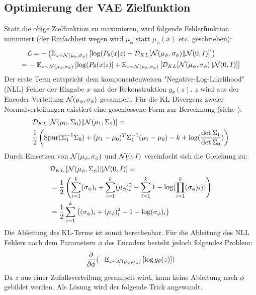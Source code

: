 \subsection{Optimierung der VAE Zielfunktion}\label{sec:vae_loss_func}
Statt die obige Zielfunktion zu maximieren, wird folgende Fehlerfunktion minimiert (der Einfachheit wegen wird $\mu_\phi$ statt $\mu_\phi(x)$ etc. geschrieben):
\begin{align}\label{eq:gradient}
  &\mathcal{L} = - \left( \mathbb{E}_{z \sim \mathcal{N}(\mu_\phi, \sigma_\phi)}\left[ \log(P_\theta(x \vert z) - \mathcal{D}_{KL}[\mathcal{N}(\mu_\phi, \sigma_\phi) \| \mathcal{N}(0, I)] \right] \right) \\
=& \, -\mathbb{E}_{z \sim \mathcal{N}(\mu_\phi, \sigma_\phi)}\left[ \log(P_\theta(x \vert z) \right] + \mathbb{E}_{z \sim \mathcal{N}(\mu_\phi, \sigma_\phi)}\left[ \mathcal{D}_{KL}[\mathcal{N}(\mu_\phi, \sigma_\phi) \| \mathcal{N}(0, I)] \right]
\end{align}
Der erste Term entspricht dem komponentenweisen "Negative-Log-Likelihood" (NLL) Fehler der Eingabe $x$ und der Rekonstruktion $g_\theta(z)$. $z$ wird aus der Encoder Verteilung $\mathcal{N}(\mu_\phi, \sigma_\phi)$ gesampelt. Für die KL Divergenz zweier Normalverteilungen existiert eine geschlossene Form zur Berechnung (siehe \cite{kl_divergence_close_form}):
\begin{align}
  &\mathcal{D}_{KL}\left[ \mathcal{N}(\mu_0, \Sigma_0) \| \mathcal{N}(\mu_1, \Sigma_1)\right] = \notag\\
  &\frac{1}{2}\left( \operatorname{Spur}(\Sigma_1^{-1}\Sigma_0) + (\mu_1 - \mu_0)^T\Sigma_1^{-1}(\mu_1 - \mu_0) - k + \log(\frac{\det\Sigma_1}{\det\Sigma_0})\right)
\end{align}
Durch Einsetzen von $\mathcal{N}(\mu_\phi, \sigma_\phi)$ und $\mathcal{N}(0, I)$ vereinfacht sich die Gleichung zu:
\begin{align}
  &\mathcal{D}_{KL}\left[ \mathcal{N}(\mu_\phi, \Sigma_\phi) \| \mathcal{N}(0, I)\right] = \notag\\
  &= \frac{1}{2}\left( \sum_{i=1}^k (\sigma_\phi)_i + \sum_{i=1}^k (\mu_\phi)_i^2 - \sum_{i=1}^k 1 - \log(\prod_{i=1}^k (\sigma_\phi)_i)) \right) \notag\\
  &= \frac{1}{2} \sum_{i=1}^k\left((\sigma_\phi)_i + (\mu_\phi)_i^2 - 1 - \log (\sigma_\phi)_i \right)
\end{align}
Die Ableitung des KL-Terms ist somit berechenbar. Für die Ableitung des NLL Fehlers nach dem Parametern $\phi$ des Encoders besteht jedoch folgendes Problem:
\begin{equation}
  \frac{\partial}{\partial \phi} (- \mathbb{E}_{z \sim \mathcal{N}(\mu_\phi, \sigma_\phi)}\left[ \log g_\theta(z) \right] )
\end{equation}
Da $z$ aus einer Zufallsverteilung gesampelt wird, kann keine Ableitung nach $\phi$ gebildet werden. Als Lösung wird der folgende Trick angewandt.

